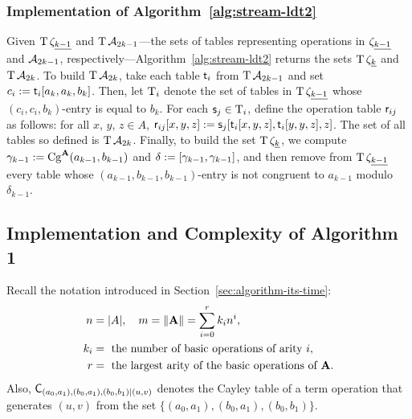 \subsubsection{Implementation of Algorithm~\ref{alg:stream-ldt2}}
Given $\operatorname{T} \zeta_{\underline{k-1}}$
and $\operatorname{T} \mathcal{A}_{2k-1}$---the sets of tables representing operations in
$\zeta_{\underline{k-1}}$ and $\mathcal{A}_{2k-1}$, respectively---Algorithm~\ref{alg:stream-ldt2} 
returns the sets $\operatorname{T} \zeta_{\underline{k}}$ and $\operatorname{T} \mathcal{A}_{2k}$.
To build $\operatorname{T} \mathcal{A}_{2k}$, take each table $\mathsf{t}_i$ from $\operatorname{T} \mathcal{A}_{2k-1}$
and set $c_i:= \mathsf{t}_i[a_k, a_k, b_k]$. Then, let $\operatorname{T}_i$ denote 
the set of tables in $\operatorname{T} \zeta_{\underline{k-1}}$ whose 
$(c_i, c_i, b_k)$-entry is equal to $b_k$. 
For each $\mathsf{s}_j \in \operatorname{T}_i$, define the operation table 
$\mathsf{r}_{ij}$ as follows:
for all $x$, $y$, $z \in A$, 
$\mathsf{r}_{ij}[x,y,z] :=  \mathsf{s}_{j}[\mathsf{t}_i[x,y,z], \mathsf{t}_i[y,y,z], z]$. 
The set of all tables so defined is $\operatorname{T} \mathcal{A}_{2k}$.
Finally, to build the set $\operatorname{T} \zeta_{\underline{k}}$, we 
compute $\gamma_{k-1} := \operatorname{Cg}^{\mathbf{A}}(a_{k-1}, b_{k-1})$ and $\delta := [\gamma_{k-1}, \gamma_{k-1}]$,
and then remove from $\operatorname{T} \zeta_{\underline{k-1}}$ every table whose 
$(a_{k-1},b_{k-1},b_{k-1})$-entry is not congruent to $a_{k-1}$ modulo $\delta_{k-1}$.






\subsection{Implementation and Complexity of Algorithm 1}
\label{sec:cc-ld-2}
Recall the notation introduced in Section~\ref{sec:algorithm-its-time}: 
\begin{align*}
  n &= |A|, \quad m=\|\mathbf{A}\| = \sum_{i=0}^r k_i n^i,\\
k_i&= \text{ the number of basic operations of arity~$i$},\\ 
r &= \text{ the largest arity of the basic operations of $\mathbf{A}$.}
\end{align*}
Also, $\mathsf{C}_{(a_0,a_1),(b_0,a_1),(b_0,b_1)|(u,v)}$ denotes the Cayley table of a
term operation that generates $(u,v)$ from the set $\{(a_0,a_1),(b_0,a_1),(b_0,b_1)\}$.

